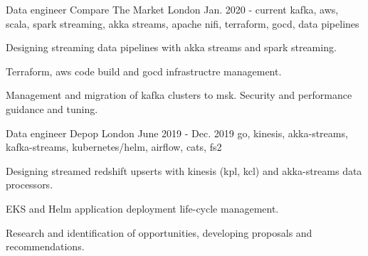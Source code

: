 
\newcommand*{\logo}[2]{\raisebox{-0.2em}{\texttt{[image: \#2]}}\hspace{0.25em}#1}

\begin{cventries}

  \cventry
    {Data engineer} %
    {\logo{\ctm Compare The Market}{../../../images/ctm.png}} %
    {London} %
    {Jan. 2020 - current} %
    {kafka, aws, scala, spark streaming, akka streams, apache nifi, terraform, gocd, data pipelines} %
    {
      \begin{cvitems} %
        \item {Designing streaming data pipelines with akka streams and spark streaming.}
        \item {Terraform, aws code build and gocd infrastructre management.}
        \item {Management and migration of kafka clusters to msk. Security and performance guidance and tuning. }
      \end{cvitems}
    }

  \cventry
    {Data engineer} %
    {\logo{\depop Depop}{../../../images/depop.jpg}} %
    {London} %
    {June 2019 - Dec. 2019} %
    {go, kinesis, akka-streams, kafka-streams, kubernetes/helm, airflow, cats, fs2} %
    {
      \begin{cvitems} %
        \item {Designing streamed redshift upserts with kinesis (kpl, kcl) and akka-streams data processors.}
        \item {EKS and Helm application deployment life-cycle management.}
        \item {Research and identification of opportunities, developing proposals and recommendations.}
      \end{cvitems}
    }


\end{cventries}

